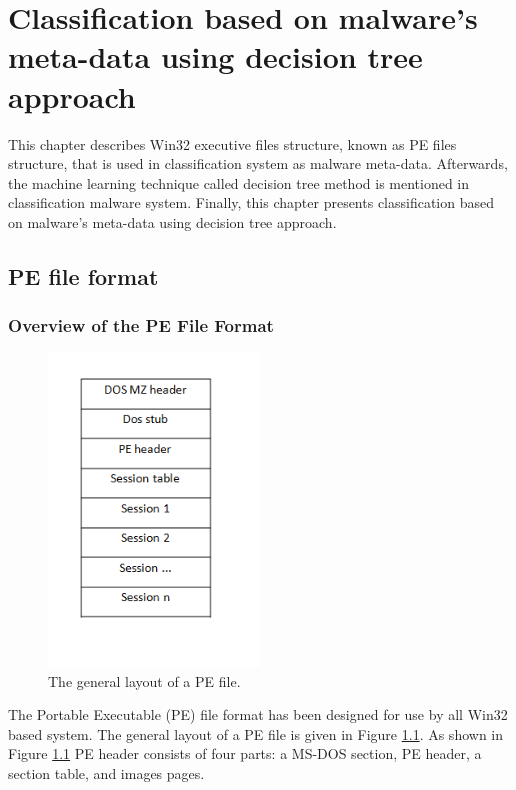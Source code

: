 \chapter{Classification based on malware's meta-data using decision tree approach}\label{chap:4}
%
%
This chapter describes Win32 executive files structure, known as PE files structure, that is used in classification system as malware meta-data. Afterwards, the machine learning technique called decision tree method is mentioned in classification malware system. Finally, this chapter presents classification based on malware's meta-data using decision tree approach. 

\section{PE file format\cite{peheaderci}}
\subsection{Overview of the PE File Format}
\begin{figure}[h!]
\centering
\includegraphics[width=0.5\textwidth]{graph/pefiles.png}
\caption{The general layout of a PE file.}
\label{fig:pefiles}
\end{figure}

The Portable Executable (PE) file format has been designed for use by all Win32 based system. The general layout of a PE file is given in Figure \ref{fig:pefiles}. As shown in Figure \ref{fig:pefiles} PE header consists of four parts: a MS-DOS section, PE header, a section table, and images pages.

